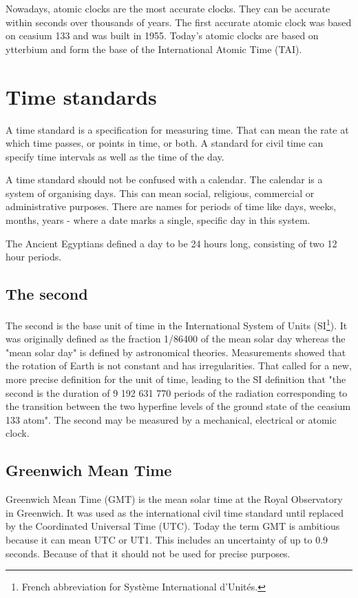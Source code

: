 Nowadays, atomic clocks are the most accurate clocks. They can be accurate within seconds over thousands of years. The first accurate atomic clock was based on ceasium 133 and was built in 1955. Today's atomic clocks are based on ytterbium and form the base of the International Atomic Time (TAI).

\section{Time standards}

A time standard is a specification for measuring time. That can mean the rate at which time passes, or points in time, or both. A standard for civil time can specify time intervals as well as the time of the day.

A time standard should not be confused with a calendar. The calendar is a system of organising days. This can mean social, religious, commercial or administrative purposes. There are names for periods of time like days, weeks, months, years - where a date marks a single, specific day in this system.

The Ancient Egyptians defined a day to be 24 hours long, consisting of two 12 hour periods.

\subsection{The second}

The second is the base unit of time in the International System of Units (SI\footnote{French abbreviation for Système International d'Unités.}).\cite{second_merriam} It was originally defined as the fraction 1/86400 of the mean solar day whereas the "mean solar day" is defined by astronomical theories. Measurements showed that the rotation of Earth is not constant and has irregularities. That called for a new, more precise definition for the unit of time, leading to the SI definition that "the second is the duration of 9 192 631 770 periods of the radiation corresponding to the transition between the two hyperfine levels of the ground state of the ceasium 133 atom".\cite{second_nist}
The second may be measured by a mechanical, electrical or atomic clock.

\subsection{Greenwich Mean Time}

Greenwich Mean Time (GMT) is the mean solar time at the Royal Observatory in Greenwich.\cite{gmt} It was used as the international civil time standard until replaced by the Coordinated Universal Time (UTC). Today the term GMT is ambitious because it can mean UTC or UT1. This includes an uncertainty of up to 0.9 seconds. Because of that it should not be used for precise purposes.

